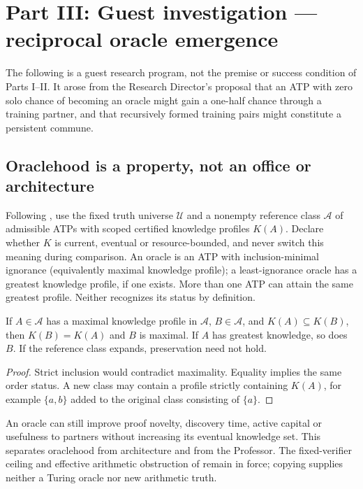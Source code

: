 \documentclass[11pt]{article}
\theoremstyle{definition}\newtheorem{definition}[theorem]{Definition}\newtheorem{conjecture}[theorem]{Conjecture}\newtheorem{example}[theorem]{Example}
\begin{document}
\section{Part III: Guest investigation --- reciprocal oracle emergence}
The following is a guest research program, not the premise or success condition of Parts I--II. It arose from the Research Director's proposal that an ATP with zero solo chance of becoming an oracle might gain a one-half chance through a training partner, and that recursively formed training pairs might constitute a persistent commune.

\subsection{Oraclehood is a property, not an office or architecture}
Following \cite{oracle}, use the fixed truth universe $\mathcal U$ and a nonempty reference class $\mathcal A$ of admissible ATPs with scoped certified knowledge profiles $K(A)$. Declare whether $K$ is current, eventual or resource-bounded, and never switch this meaning during comparison. An oracle is an ATP with inclusion-minimal ignorance (equivalently maximal knowledge profile); a least-ignorance oracle has a greatest knowledge profile, if one exists. More than one ATP can attain the same greatest profile. Neither recognizes its status by definition.
\begin{proposition}
If $A\in\mathcal A$ has a maximal knowledge profile in $\mathcal A$, $B\in\mathcal A$, and $K(A)\subseteq K(B)$, then $K(B)=K(A)$ and $B$ is maximal. If $A$ has greatest knowledge, so does $B$. If the reference class expands, preservation need not hold.
\end{proposition}
\begin{proof}Strict inclusion would contradict maximality. Equality implies the same order status. A new class may contain a profile strictly containing $K(A)$, for example $\{a,b\}$ added to the original class consisting of $\{a\}$.\end{proof}
An oracle can still improve proof novelty, discovery time, active capital or usefulness to partners without increasing its eventual knowledge set. This separates oraclehood from architecture and from the Professor. The fixed-verifier ceiling and effective arithmetic obstruction of \cite{oracle} remain in force; copying supplies neither a Turing oracle nor new arithmetic truth.
\end{document}
